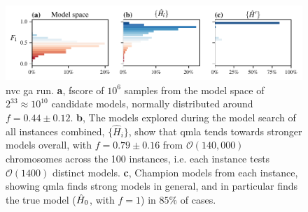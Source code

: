\begin{figure}
    \begin{center}
        \includegraphics{experimental_study/figures/nv_ga_run_models_by_f.pdf}
    \end{center}
    \caption[Nitrogen-vacancy centre genetic algorithm run]{
        \Acrlong{nvc} \acrlong{ga} \gls{run}.
        \textbf{a}, 
            \gls{fscore} of $10^6$ samples from the \gls{model space} of $2^{33}\approx10^{10}$ candidate models,
            normally distributed around $f=0.44 \pm 0.12$. 
        \textbf{b}, The models explored during the model search of all \glspl{instance} combined, 
            $\{\hat{H}_i\}$, show that \gls{qmla} tends towards stronger models overall, 
            with $f = 0.79 \pm 0.16$ from $\mathcal{O}(140,000)$ chromosomes across the 100 instances, 
            i.e. each \gls{instance} tests $\mathcal{O}(1400)$ distinct models. 
        \textbf{c}, Champion models from each instance, showing \gls{qmla} finds strong models 
            in general, and in particular finds the \gls{true model} ($\hat{H}_0$, with $f=1$) in $85\%$ of cases.
        }
    \label{fig:nv_ga_run_models}
\end{figure}


